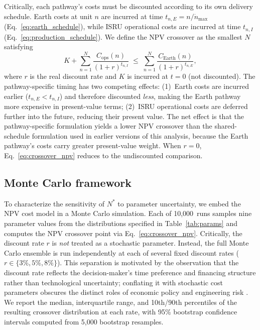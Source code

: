 \documentclass[preprint,12pt]{elsarticle}
\begin{document}
Critically, each pathway's costs must be discounted according to its own delivery schedule. Earth costs at unit $n$ are incurred at time $t_{n,E} = n/\dot{n}_{\max}$ (Eq.~\ref{eq:earth_schedule}), while ISRU operational costs are incurred at time $t_{n,I}$ (Eq.~\ref{eq:production_schedule}). We define the NPV crossover as the smallest $N$ satisfying
\begin{equation}
  K + \sum_{n=1}^{N} \frac{C_{\mathrm{ops}}(n)}{(1+r)^{t_{n,I}}} \;\leq\; \sum_{n=1}^{N} \frac{C_{\mathrm{Earth}}(n)}{(1+r)^{t_{n,E}}},
  \label{eq:crossover_npv}
\end{equation}
where $r$ is the real discount rate and $K$ is incurred at $t = 0$ (not discounted). The pathway-specific timing has two competing effects: (1)~Earth costs are incurred earlier ($t_{n,E} < t_{n,I}$) and therefore discounted \emph{less}, making the Earth pathway more expensive in present-value terms; (2)~ISRU operational costs are deferred further into the future, reducing their present value. The net effect is that the pathway-specific formulation yields a lower NPV crossover than the shared-schedule formulation used in earlier versions of this analysis, because the Earth pathway's costs carry greater present-value weight. When $r = 0$, Eq.~\ref{eq:crossover_npv} reduces to the undiscounted comparison.

\subsection{Monte Carlo framework}

To characterize the sensitivity of $N^*$ to parameter uncertainty, we embed the NPV cost model in a Monte Carlo simulation. Each of 10{,}000~runs samples nine parameter values from the distributions specified in Table~\ref{tab:params} and computes the NPV crossover point via Eq.~\ref{eq:crossover_npv}. Critically, the discount rate $r$ is \emph{not} treated as a stochastic parameter. Instead, the full Monte Carlo ensemble is run independently at each of several fixed discount rates ($r \in \{3\%, 5\%, 8\%\}$). This separation is motivated by the observation that the discount rate reflects the decision-maker's time preference and financing structure rather than technological uncertainty; conflating it with stochastic cost parameters obscures the distinct roles of economic policy and engineering risk \cite{arrow2014}. We report the median, interquartile range, and 10th/90th percentiles of the resulting crossover distribution at each rate, with 95\% bootstrap confidence intervals computed from 5{,}000 bootstrap resamples.
\end{document}
